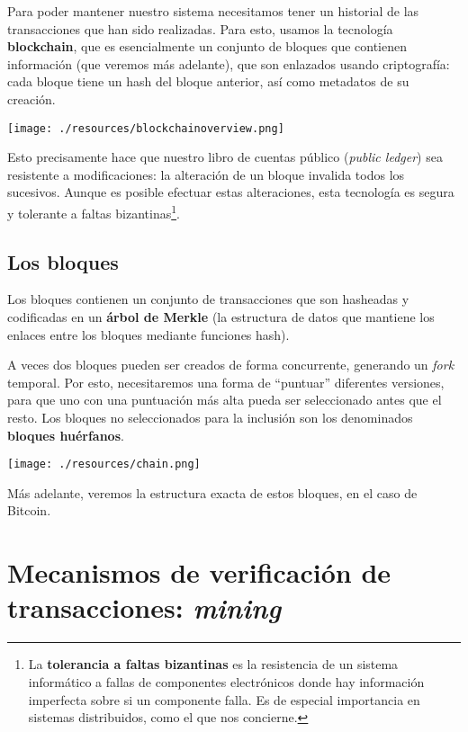 \documentclass[10pt, a4paper]{article}
\theoremstyle{theorem-style}
\theoremstyle{theorem-style}
\theoremstyle{definition-style}
\theoremstyle{remark-style}
\theoremstyle{example-style}
\theoremstyle{definition-style}
\theoremstyle{remark-style}
\begin{document}
Para poder mantener nuestro sistema necesitamos tener un historial de las transacciones que han sido realizadas. Para esto, usamos la tecnología \textbf{blockchain}, que es esencialmente un conjunto de bloques que contienen información (que veremos más adelante), que son enlazados usando criptografía: cada bloque tiene un hash del bloque anterior, así como metadatos de su creación.

\begin{center}
	\texttt{[image: ./resources/blockchainoverview.png]}
\end{center}

Esto precisamente hace que nuestro libro de cuentas público (\emph{public ledger}) sea resistente a modificaciones: la alteración de un bloque invalida todos los sucesivos. Aunque es posible efectuar estas alteraciones, esta tecnología es segura y tolerante a faltas bizantinas\footnote{La \textbf{tolerancia a faltas bizantinas} es la resistencia de un sistema informático a fallas de componentes electrónicos donde hay información imperfecta sobre si un componente falla. Es de especial importancia en sistemas distribuidos, como el que nos concierne.}.

\subsection{Los bloques}

Los bloques contienen un conjunto de transacciones que son hasheadas y codificadas en un \textbf{árbol de Merkle} (la estructura de datos que mantiene los enlaces entre los bloques mediante funciones hash).
\vspace{3cm}
\pagebreak

A veces dos bloques pueden ser creados de forma concurrente, generando un \emph{fork} temporal. Por esto, necesitaremos una forma de ``puntuar'' diferentes versiones, para que uno con una puntuación más alta pueda ser seleccionado antes que el resto. Los bloques no seleccionados para la inclusión son los denominados \textbf{bloques huérfanos}.

\begin{center}
	\texttt{[image: ./resources/chain.png]}
\end{center}

Más adelante, veremos la estructura exacta de estos bloques, en el caso de Bitcoin.


\section{Mecanismos de verificación de
transacciones: \emph{mining}}\label{mecanismos-de-verificaciuxf3n-de-transacciones}
\end{document}
